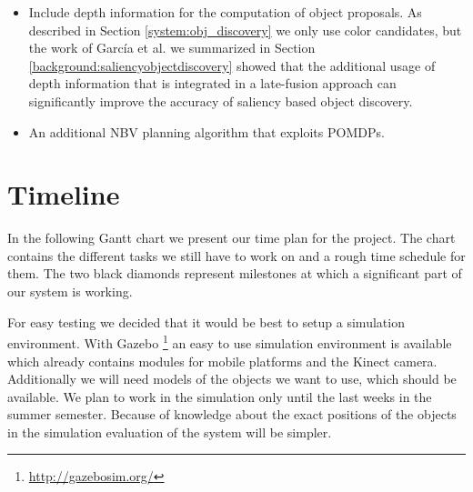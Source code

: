 \documentclass[a4paper,11pt,english]{article}
\begin{document}
\begin{itemize}
	\item Include depth information for the computation of object proposals.
	As described in Section \ref{system:obj_discovery} we only use color candidates, but the work of García et al. we summarized in Section \ref{background:saliencyobjectdiscovery} showed that the additional usage of depth information that is integrated in a late-fusion approach can significantly improve the accuracy of saliency based object discovery.
	\item An additional NBV planning algorithm that exploits POMDPs.
\end{itemize}

\section{Timeline}
\label{timeline}

In the following Gantt chart we present our time plan for the project.
The chart contains the different tasks we still have to work on and a rough time schedule for them.
The two black diamonds represent milestones at which a significant part of our system is working.\medskip

\noindent{}

For easy testing we decided that it would be best to setup a simulation environment.
With Gazebo \footnote{\url{http://gazebosim.org/}} an easy to use simulation environment is available which already contains modules for mobile platforms and the Kinect camera.
Additionally we will need models of the objects we want to use, which should be available.
We plan to work in the simulation only until the last weeks in the summer semester.
Because of knowledge about the exact positions of the objects in the simulation evaluation of the system will be simpler.
\end{document}
